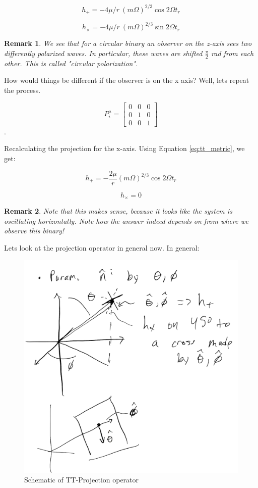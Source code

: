 \documentclass{article}
\newtheorem*{remark}{Remark}
\theoremstyle{definition}
\theoremstyle{remark}
\begin{document}
$$
h_+ = -4 \mu / r \: (m \Omega)^{2/3} \cos 2 \Omega t_r
$$

$$
h_\times = -4 \mu / r \: (m \Omega)^{2/3}  \sin 2 \Omega t_r
$$

\begin{remark}
We see that for a circular binary an observer on the z-axis sees two differently polarized waves. In particular, these waves are shifted $\frac{\pi}{2}$ rad from each other. This is called "circular polarization".
\end{remark}

How would things be different if the observer is on the x axis? Well, lets repeat the process.


$$
P_i^a = 
\begin{bmatrix}
0 & 0 & 0\\
0 & 1 & 0\\
0 & 0 & 1
\end{bmatrix}
$$.

Recalculating the projection for the x-axis. Using Equation \ref{eq:tt_metric}, we get:

$$
h_+ = - \frac{2 \mu}{r}  (m \Omega)^{2/3} \cos 2 \Omega t_r 
$$

$$
h_\times = 0
$$

\begin{remark}
Note that this makes sense, because it looks like the system is oscillating horizontally. Note how the answer indeed depends on from where we observe this binary!
\end{remark}

Lets look at the projection operator in general now. In general:

\begin{figure}
    \centering
    \includegraphics{figures/tt_projection_diagram.png}
    \caption{Schematic of TT-Projection operator}
    \label{fig:tt_projection}
\end{figure}
\end{document}
